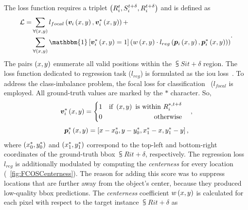 The loss function requires a triplet $\left( {{R}_{i}^{t}, {S}_{i}^{t + \delta}, {R}_{i}^{t + \delta}} \right)$ and is defined as
\begin{equation}
    \begin{aligned}
        \lossf =
         & \sum_{\forall \rbrackets{x, y}}
        \func{l_{focal}}{
            \func{\mtxsub{v}{i}}{
                x, y
            },
            \func{\mtxsubsup{v}{i}{*}}{
                x, y
            }
        } +                                \\
         & \sum_{\forall \rbrackets{x, y}}
        \mathbbm{1}
        \sbrackets{
            \func{\mtxsubsup{v}{i}{*}}{
                x, y
            } = 1
        }
        \rbrackets{
            \func{w}{x, y}
            \cdot
            \func{l_{reg}}{
                \func{\mtxsub{p}{i}}{x, y},
                \func{\mtxsubsup{p}{i}{*}}{x, y}
            }
        }
    \end{aligned}.
\end{equation}
The pairs $\left( {x, y} \right)$ enumerate all valid positions within the $\subsup{S}{i}{t + \delta}$ region. The loss function dedicated to regression task ($l_{reg}$) is formulated as the \gls{iou} loss~\cite{danelljan2019atom, yu2016unitbox}. To address the class-imbalance problem, the focal loss for classification~\cite{lin2018focal} ($l_{focal}$ is employed. All ground-truth values are marked by the $*$ character. So,
\begin{equation}
    {\bm{v}_{i}^{*}} \left( x, y \right) =
    \begin{cases}
        \begin{aligned}
             & 1 & \text{if } \left( {x, y} \right) \text{ is within } {R}_{i}^{*, t + \delta} \\
             & 0 & \text{otherwise}                                                            \\
        \end{aligned}
    \end{cases},
\end{equation}
\begin{equation}
    {\bm{p}_{i}^{*}} \left( x, y \right) =
    \left[ {
        x - {x}_{0}^{*},
        y - {y}_{0}^{*},
        {x}_{1}^{*} - x,
        {y}_{1}^{*} - y
    } \right],
\end{equation}
where $\left( {{x}_{0}^{*}, {y}_{0}^{*}} \right)$ and $\left( {{x}_{1}^{*}, {y}_{1}^{*}} \right)$ correspond to the top-left and bottom-right coordinates of the ground-truth \gls{bbox} $\subsup{R}{i}{t + \delta}$, respectively. The regression loss $l_{reg}$ is additionally modulated by computing the \emph{centerness} for every location (\figtext{}~\ref{fig:FCOSCenterness}). The reason for adding this score was to suppress locations that are further away from the object's center, because they produced low-quality \gls{bbox} predictions. The \emph{centerness} coefficient ${w} \left( x, y \right)$ is calculated for each pixel with respect to the target instance $\subsup{R}{i}{t + \delta}$ as
